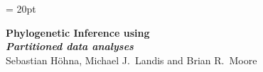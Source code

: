 \documentclass[11pt]{article}
\begin{document}
\renewcommand{\headrulewidth}{0.5pt}
\headsep = 20pt
\lhead{ }
\thispagestyle{plain}
\begin{center}

\textbf{\LARGE Phylogenetic Inference using \RevBayes}\\\vspace{2mm}
\textbf{\it{\Large Partitioned data analyses}}\\\vspace{2mm}
\vspace{1cm}
{\Large Sebastian H{\"o}hna, Michael J.~Landis and Brian R.~Moore}
\vspace{1cm}
\end{center}


\def \ResourcePath {./}
\def \GlobalResourcePath {../}

\end{document}
